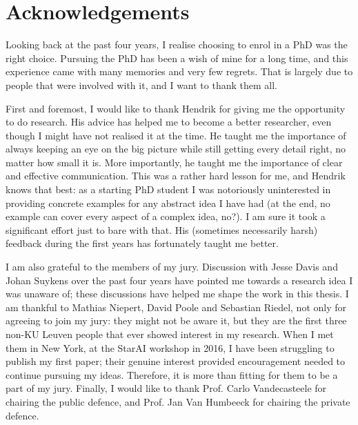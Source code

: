 \chapter*{Acknowledgements}                                  \label{ch:preface}



Looking back at the past four years, I realise choosing to enrol in a PhD was the right choice.
Pursuing the PhD has been a wish of mine for a long time, and this experience came with many memories and very few regrets.
That is largely due to people that were involved with it, and I want to thank them all.








First and foremost, I would like to thank Hendrik for giving me the opportunity to do research.
His advice has helped me to become a better researcher, even though I might have not realised it at the time.
He taught me the importance of always keeping an eye on the big picture while still getting every detail right, no matter how small it is.
More importantly, he taught me the importance of clear and effective communication.
This was a rather hard lesson for me, and Hendrik knows that best: as a starting PhD student I was notoriously uninterested in providing concrete examples for any abstract idea I have had (at the end, no example can cover every aspect of a complex idea, no?).
I am sure it took a significant effort just to bare with that.
His (sometimes necessarily harsh) feedback during the first years has fortunately taught me better.




I am also grateful to the members of my jury.
Discussion with Jesse Davis and Johan Suykens over the past four years have pointed me towards a research idea I was unaware of; these discussions have helped me shape the work in this thesis.
I am thankful to Mathias Niepert, David Poole and Sebastian Riedel, not only for agreeing to join my jury: they might not be aware it, but they are the first three non-KU Leuven people that ever showed interest in my research.
When I met them in New York, at the StarAI workshop in 2016, I have been struggling to publish my first paper; their genuine interest provided encouragement needed to continue pursuing my ideas.
Therefore, it is more than fitting for them to be a part of my jury.
Finally, I would like to thank Prof. Carlo Vandecasteele for chairing the public defence, and Prof. Jan Van Humbeeck for chairing the private defence.




